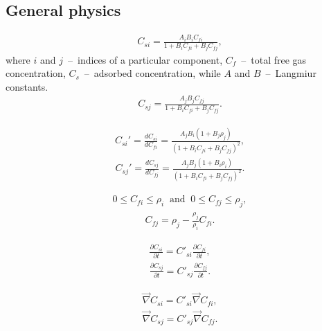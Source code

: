 \documentclass[a4paper,14pt,english]{extreport}
\begin{document}
 \subsection*{General physics}
 \begin{eqnarray}
 	\label{eq:langm_only_adsorbed_conc_i}
 	C_{si} =  \frac{A_{i} B_{i} C_{fi}}{\mathit{1}+B_{i}C_{fi}+B_{j}C_{fj}},
 \end{eqnarray}
where $i$ and $j$~--~indices of a particular component, $C_{f}$~--~total free gas concentration, $C_{s}$~--~adsorbed concentration, while  $A$ and $B$~--~Langmiur constants. 
 \begin{eqnarray}
 	\label{eq:langm_only_adsorbed_conc_j}
 	C_{sj} =  \frac{A_{j} B_{j} C_{fj}}{\mathit{1}+B_{i}C_{fi}+B_{j}C_{fj}}.
 \end{eqnarray}
 
 \begin{eqnarray}
 	\label{eq:langm_only_adsorbed_conc_i_deriv}
 	C_{si}'  =  \frac{dC_{si}}{dC_{fi}} =  \frac{A_{j}B_{i} \left(\mathit{1}+B_{j}\rho_{j}\right)}{\left(\mathit{1}+B_{i}C_{fi}+B_{j}C_{fj}\right)^\mathit{2}},
 \end{eqnarray}
 \begin{eqnarray}
 	\label{eq:langm_only_adsorbed_conc_j_deriv}
 	C_{sj}'  =  \frac{dC_{sj}}{dC_{fj}} =  \frac{A_{j}B_{j} \left(\mathit{1}+B_{i}\rho_{i}\right)}{\left(\mathit{1}+B_{i}C_{fi}+B_{j}C_{fj}\right)^\mathit{2}}.
 \end{eqnarray}

\begin{eqnarray}
	\label{eq:free_concentration_constaints}
	\mathit{0} \leq C_{fi} \leq \rho_i \;\; \text{and} \;\; \mathit{0} \leq C_{fj} \leq \rho_j,
\end{eqnarray}
\begin{eqnarray}
	\label{eq:free_densities_concentration}
	C_{fj} =\rho_j -  \frac{\rho_j}{\rho_i}C_{fi}.
\end{eqnarray}

\begin{eqnarray}
	\label{eq:langm_only_chain_rule_timeder_i}
	\frac{\partial C_{si}}{\partial t} = C'_{si}\frac{\partial C_{fi}}{\partial t},
\end{eqnarray}
\begin{eqnarray}
	\label{eq:langm_only_chain_rule_timeder_j}
	\frac{\partial C_{sj}}{\partial t} = C'_{sj}\frac{\partial C_{fj}}{\partial t}.
\end{eqnarray}

\begin{eqnarray}
	\label{eq:langm_fick_chain_rule_spaceder_i}
	\vec\nabla C_{si} = C'_{si}\vec\nabla C_{fi},
\end{eqnarray}
\begin{eqnarray}
	\label{eq:langm_fick_chain_rule_spaceder_j}
	\vec\nabla C_{sj} = C'_{sj}\vec\nabla C_{fj}.
\end{eqnarray}
 
\end{document}
